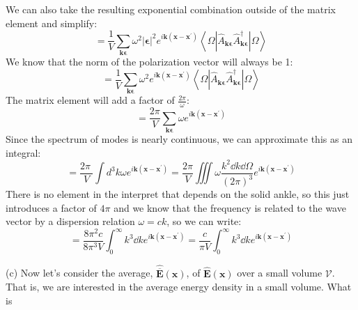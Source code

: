 \documentclass[12pt]{article}
\begin{document}
We can also take the resulting exponential combination outside of the matrix element and simplify:
\begin{equation}
  = \frac{1}{V}\sum_{\mathbf{k} \boldsymbol{\epsilon}} \omega ^{2}|\boldsymbol{\epsilon}|^2 e^{i \textbf{k}\left( \textbf{x}-\textbf{x}^{\prime}\right)}\left\langle\Omega\left|\hat{A}_{\mathbf{k} \boldsymbol{\epsilon}} \hat{A}_{\mathbf{k} \boldsymbol{\epsilon}}^{\dagger}\right| \Omega\right\rangle
\end{equation}
We know that the norm of the polarization vector will always be 1:
\begin{equation}
  = \frac{1}{V}\sum_{\mathbf{k} \boldsymbol{\epsilon}} \omega ^{2}e^{i \textbf{k}\left( \textbf{x}-\textbf{x}^{\prime}\right)}\left\langle\Omega\left|\hat{A}_{\mathbf{k} \boldsymbol{\epsilon}} \hat{A}_{\mathbf{k} \boldsymbol{\epsilon}}^{\dagger}\right| \Omega\right\rangle
\end{equation}
The matrix element will add a factor of $\frac{2\pi}{\omega }$:
\begin{equation}
  = \frac{2\pi }{V}\sum_{\mathbf{k} \boldsymbol{\epsilon}} \omega e^{i \textbf{k}\left( \textbf{x}-\textbf{x}^{\prime}\right)}
\end{equation}
Since the spectrum of modes is nearly continuous, we can approximate this as an integral:
\begin{equation}
  = \frac{2\pi \ }{V}\int d^3k \omega e^{i \textbf{k}\left( \textbf{x}-\textbf{x}^{\prime}\right)} = \frac{2\pi }{V}\iiint \omega \frac{k^{2} \dd{k}\dd{\Omega}}{(2\pi)^3} e^{i \textbf{k}\left( \textbf{x}-\textbf{x}^{\prime}\right)}
\end{equation}
There is no element in the interpret that depends on the solid ankle, so this just introduces a factor of $4\pi$ and we know that the frequency is related to the wave vector by a dispersion relation $\omega = ck$, so we can write:
\begin{equation}
  = \frac{8 \pi ^2  c}{8\pi^3V}\int_{0}^{\infty } k^3 \dd{k} e^{i \textbf{k}\left( \textbf{x}-\textbf{x}^{\prime}\right)} = \frac{c}{\pi V}\int_{0}^{\infty } k^3 \dd{k} e^{i \textbf{k}\left( \textbf{x}-\textbf{x}^{\prime}\right)}
\end{equation}



(c) Now let's consider the average, $\hat{\overline{\mathbf{E}}}(\mathbf{x})$, of $\hat{\mathbf{E}}(\mathbf{x})$ over a small volume $\mathcal{V}$. That is, we are interested in the average energy density in a small volume. What is
\end{document}
